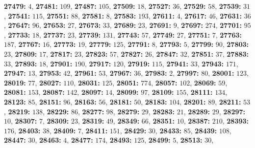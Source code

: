 \textsf{\bfseries 27479:} $4$, \textsf{\bfseries 27481:} $109$, \textsf{\bfseries 27487:} $105$, \textsf{\bfseries 27509:} $18$, \textsf{\bfseries 27527:} $36$, \textsf{\bfseries 27529:} $58$, \textsf{\bfseries 27539:} $31$, \textsf{\bfseries 27541:} $115$, \textsf{\bfseries 27551:} $88$, \textsf{\bfseries 27581:} $8$, \textsf{\bfseries 27583:} $193$, \textsf{\bfseries 27611:} $4$, \textsf{\bfseries 27617:} $46$, \textsf{\bfseries 27631:} $36$, \textsf{\bfseries 27647:} $96$, \textsf{\bfseries 27653:} $27$, \textsf{\bfseries 27673:} $33$, \textsf{\bfseries 27689:} $23$, \textsf{\bfseries 27691:} $9$, \textsf{\bfseries 27697:} $274$, \textsf{\bfseries 27701:} $95$, \textsf{\bfseries 27733:} $18$, \textsf{\bfseries 27737:} $23$, \textsf{\bfseries 27739:} $131$, \textsf{\bfseries 27743:} $57$, \textsf{\bfseries 27749:} $27$, \textsf{\bfseries 27751:} $7$, \textsf{\bfseries 27763:} $187$, \textsf{\bfseries 27767:} $16$, \textsf{\bfseries 27773:} $19$, \textsf{\bfseries 27779:} $125$, \textsf{\bfseries 27791:} $8$, \textsf{\bfseries 27793:} $5$, \textsf{\bfseries 27799:} $90$, \textsf{\bfseries 27803:} $23$, \textsf{\bfseries 27809:} $17$, \textsf{\bfseries 27817:} $23$, \textsf{\bfseries 27823:} $57$, \textsf{\bfseries 27827:} $26$, \textsf{\bfseries 27847:} $32$, \textsf{\bfseries 27851:} $37$, \textsf{\bfseries 27883:} $33$, \textsf{\bfseries 27893:} $18$, \textsf{\bfseries 27901:} $190$, \textsf{\bfseries 27917:} $120$, \textsf{\bfseries 27919:} $115$, \textsf{\bfseries 27941:} $33$, \textsf{\bfseries 27943:} $171$, \textsf{\bfseries 27947:} $13$, \textsf{\bfseries 27953:} $42$, \textsf{\bfseries 27961:} $53$, \textsf{\bfseries 27967:} $36$, \textsf{\bfseries 27983:} $2$, \textsf{\bfseries 27997:} $80$, \textsf{\bfseries 28001:} $123$, \textsf{\bfseries 28019:} $77$, \textsf{\bfseries 28027:} $110$, \textsf{\bfseries 28031:} $125$, \textsf{\bfseries 28051:} $774$, \textsf{\bfseries 28057:} $102$, \textsf{\bfseries 28069:} $59$, \textsf{\bfseries 28081:} $153$, \textsf{\bfseries 28087:} $142$, \textsf{\bfseries 28097:} $14$, \textsf{\bfseries 28099:} $97$, \textsf{\bfseries 28109:} $155$, \textsf{\bfseries 28111:} $134$, \textsf{\bfseries 28123:} $85$, \textsf{\bfseries 28151:} $96$, \textsf{\bfseries 28163:} $56$, \textsf{\bfseries 28181:} $50$, \textsf{\bfseries 28183:} $104$, \textsf{\bfseries 28201:} $89$, \textsf{\bfseries 28211:} $53$, \textsf{\bfseries 28219:} $138$, \textsf{\bfseries 28229:} $86$, \textsf{\bfseries 28277:} $98$, \textsf{\bfseries 28279:} $29$, \textsf{\bfseries 28283:} $21$, \textsf{\bfseries 28289:} $29$, \textsf{\bfseries 28297:} $10$, \textsf{\bfseries 28307:} $7$, \textsf{\bfseries 28309:} $23$, \textsf{\bfseries 28319:} $49$, \textsf{\bfseries 28349:} $66$, \textsf{\bfseries 28351:} $10$, \textsf{\bfseries 28387:} $210$, \textsf{\bfseries 28393:} $176$, \textsf{\bfseries 28403:} $38$, \textsf{\bfseries 28409:} $7$, \textsf{\bfseries 28411:} $151$, \textsf{\bfseries 28429:} $30$, \textsf{\bfseries 28433:} $85$, \textsf{\bfseries 28439:} $108$, \textsf{\bfseries 28447:} $30$, \textsf{\bfseries 28463:} $4$, \textsf{\bfseries 28477:} $174$, \textsf{\bfseries 28493:} $125$, \textsf{\bfseries 28499:} $5$, \textsf{\bfseries 28513:} $30$, 
